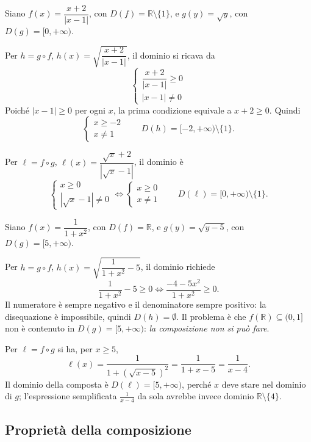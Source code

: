 \documentclass[11pt,a4paper]{article}
\begin{document}
\begin{esempio}
Siano $f(x) = \dfrac{x + 2}{|x - 1|}$, con $D(f) = \mathbb{R} \setminus \{1\}$, e $g(y) = \sqrt{y}$, con $D(g) = [0, +\infty)$.

Per $h = g \circ f$, $h(x) = \sqrt{\dfrac{x+2}{|x-1|}}$, il dominio si ricava da
\[
\begin{cases} \dfrac{x+2}{|x-1|} \geq 0 \\[4pt] |x - 1| \neq 0 \end{cases}
\]
Poiché $|x-1| \geq 0$ per ogni $x$, la prima condizione equivale a $x + 2 \geq 0$. Quindi
\[
\begin{cases} x \geq -2 \\ x \neq 1 \end{cases}
\qquad D(h) = [-2, +\infty) \setminus \{1\}.
\]

Per $\ell = f \circ g$, $\ell(x) = \dfrac{\sqrt{x} + 2}{|\sqrt{x} - 1|}$, il dominio è
\[
\begin{cases} x \geq 0 \\ |\sqrt{x} - 1| \neq 0 \end{cases}
\iff
\begin{cases} x \geq 0 \\ x \neq 1 \end{cases}
\qquad D(\ell) = [0, +\infty) \setminus \{1\}.
\]
\end{esempio}

\begin{esempio}
Siano $f(x) = \dfrac{1}{1 + x^2}$, con $D(f) = \mathbb{R}$, e $g(y) = \sqrt{y - 5}$, con $D(g) = [5, +\infty)$.

Per $h = g \circ f$, $h(x) = \sqrt{\dfrac{1}{1+x^2} - 5}$, il dominio richiede
\[
\frac{1}{1+x^2} - 5 \geq 0 \iff \frac{-4 - 5x^2}{1 + x^2} \geq 0 .
\]
Il numeratore è sempre negativo e il denominatore sempre positivo: la disequazione è impossibile, quindi $D(h) = \emptyset$. Il problema è che $f(\mathbb{R}) \subseteq (0, 1]$ non è contenuto in $D(g) = [5, +\infty)$: \emph{la composizione non si può fare}.

Per $\ell = f \circ g$ si ha, per $x \geq 5$,
\[
\ell(x) = \frac{1}{1 + (\sqrt{x - 5})^2} = \frac{1}{1 + x - 5} = \frac{1}{x - 4}.
\]
Il dominio della composta è $D(\ell) = [5, +\infty)$, perché $x$ deve stare nel dominio di $g$; l'espressione semplificata $\frac{1}{x-4}$ da sola avrebbe invece dominio $\mathbb{R} \setminus \{4\}$.
\end{esempio}

\subsection{Proprietà della composizione}
\end{document}
